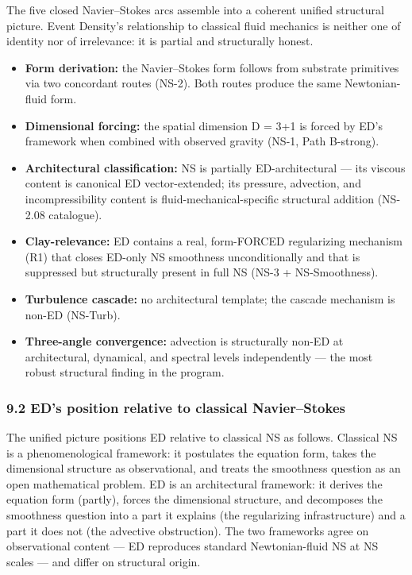 \documentclass[
  11pt,a4paper]{article}
\providecommand{\tightlist}{%
  \setlength{\itemsep}{0pt}\setlength{\parskip}{0pt}}
\begin{document}
The five closed Navier--Stokes arcs assemble into a coherent unified
structural picture. Event Density's relationship to classical fluid
mechanics is neither one of identity nor of irrelevance: it is partial
and structurally honest.

\begin{itemize}
\tightlist
\item
  \textbf{Form derivation:} the Navier--Stokes form follows from
  substrate primitives via two concordant routes (NS-2). Both routes
  produce the same Newtonian-fluid form.
\item
  \textbf{Dimensional forcing:} the spatial dimension D = 3+1 is forced
  by ED's framework when combined with observed gravity (NS-1, Path
  B-strong).
\item
  \textbf{Architectural classification:} NS is partially
  ED-architectural --- its viscous content is canonical ED
  vector-extended; its pressure, advection, and incompressibility
  content is fluid-mechanical-specific structural addition (NS-2.08
  catalogue).
\item
  \textbf{Clay-relevance:} ED contains a real, form-FORCED regularizing
  mechanism (R1) that closes ED-only NS smoothness unconditionally and
  that is suppressed but structurally present in full NS (NS-3 +
  NS-Smoothness).
\item
  \textbf{Turbulence cascade:} no architectural template; the cascade
  mechanism is non-ED (NS-Turb).
\item
  \textbf{Three-angle convergence:} advection is structurally non-ED at
  architectural, dynamical, and spectral levels independently --- the
  most robust structural finding in the program.
\end{itemize}

\subsubsection{9.2 ED's position relative to classical
Navier--Stokes}\label{eds-position-relative-to-classical-navierstokes}

The unified picture positions ED relative to classical NS as follows.
Classical NS is a phenomenological framework: it postulates the equation
form, takes the dimensional structure as observational, and treats the
smoothness question as an open mathematical problem. ED is an
architectural framework: it derives the equation form (partly), forces
the dimensional structure, and decomposes the smoothness question into a
part it explains (the regularizing infrastructure) and a part it does
not (the advective obstruction). The two frameworks agree on
observational content --- ED reproduces standard Newtonian-fluid NS at
NS scales --- and differ on structural origin.
\end{document}
